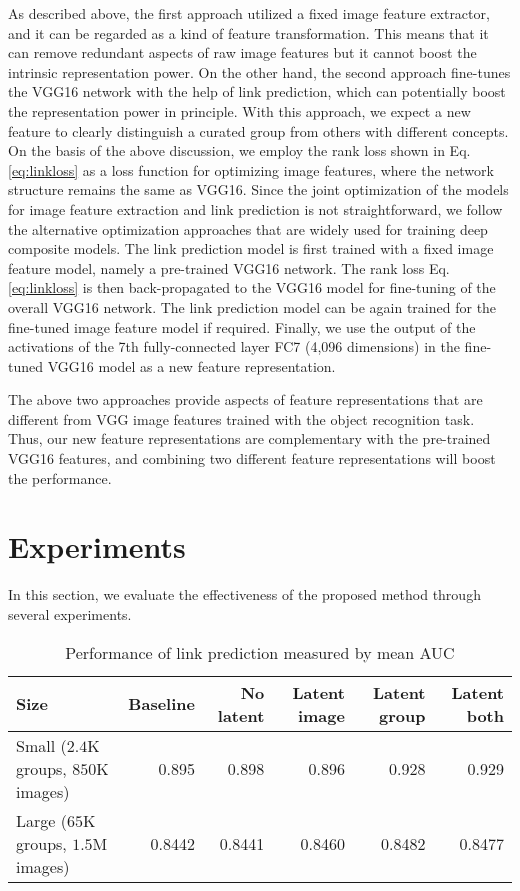 \documentclass[letterpaper]{article} %
\begin{document}
As described above, the first approach utilized a fixed image feature extractor, and it can be regarded as a kind of feature transformation.
This means that it can remove redundant aspects of raw image features but it cannot boost the intrinsic representation power.
On the other hand, the second approach fine-tunes the VGG16 network with the help of link prediction, which can potentially boost the representation power in principle.
With this approach, we expect a new feature to clearly distinguish a curated group from others with different concepts.
On the basis of the above discussion, we employ the rank loss shown in Eq. \eqref{eq:linkloss} as a loss function for optimizing image features, where the network structure remains the same as VGG16.
Since the joint optimization of the models for image feature extraction and link prediction is not straightforward, we follow the alternative optimization approaches that are widely used for training deep composite models.
The link prediction model is first trained with a fixed image feature model, namely a pre-trained VGG16 network.
The rank loss Eq. \eqref{eq:linkloss} is then back-propagated to the VGG16 model for fine-tuning of the overall VGG16 network.
The link prediction model can be again trained for the fine-tuned image feature model if required.
Finally, we use the output of the activations of the 7th fully-connected layer FC7 (4,096 dimensions) in the fine-tuned VGG16 model as a new feature representation.

The above two approaches provide aspects of feature representations that are different from VGG image features trained with the object recognition task.
Thus, our new feature representations are complementary with the pre-trained VGG16 features, and combining two different feature representations will boost the performance.


\section{Experiments}
\label{sec:exp}

In this section, we evaluate the effectiveness of the proposed method through several experiments.

\begin{table*}[t]
  \caption{Performance of link prediction measured by mean AUC}
  \label{table:exp_link}
  \begin{center}
    \begin{tabular}{|l|r|r|r|r|r|}\hline
      Size                                 & Baseline & No latent & Latent image & Latent group & Latent both \\ \hline
      Small ($2.4$K groups, $850$K images) & 0.895    & 0.898     & 0.896        & 0.928        & 0.929       \\ \hline
      Large ($65$K groups, $1.5$M images)  & 0.8442   & 0.8441    & 0.8460       & 0.8482       & 0.8477      \\ \hline
    \end{tabular}
  \end{center}
\end{table*}
\end{document}
